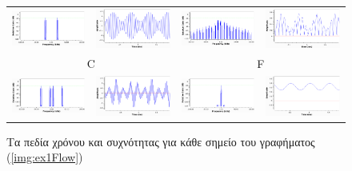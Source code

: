 \documentclass[12pt]{report}
\begin{document}
\begin{figure}[h]
\begin{tabular}{cccc}
                    \includegraphics[width=.23\linewidth]{ex1Bf.png} & \includegraphics[width=.23\linewidth]{ex1Bt.png} & \includegraphics[width=.23\linewidth]{ex1Ef.png} & \includegraphics[width=.23\linewidth]{ex1Et.png}\\
                    \multicolumn{2}{c}{C} & \multicolumn{2}{c}{F}\\
                    \includegraphics[width=.23\linewidth]{ex1Cf.png} & \includegraphics[width=.23\linewidth]{ex1Ct.png} & \includegraphics[width=.23\linewidth]{ex1Ff.png} & \includegraphics[width=.23\linewidth]{ex1Ft.png}
                \end{tabular}
                \caption{Τα πεδία χρόνου και συχνότητας για κάθε σημείο του γραφήματος (\ref{img:ex1Flow})}
                \label{img:timefreq}
            \end{figure}
            

    
    
\end{document}
